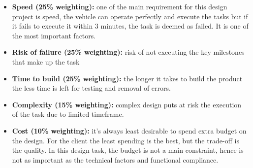 \documentclass[a4paper]{article}
\begin{document}
\begin{itemize}
\item \textbf{Speed (25\% weighting):} one of the main requirement for this design project is speed, the vehicle can operate perfectly and execute the tasks but if it fails to execute it within 3 minutes, the task is deemed as failed. It is one of the most important factors.
\item \textbf{Risk of failure (25\% weighting):} risk of not executing the key milestones that make up the task 
\item \textbf{Time to build (25\% weighting):} the longer it takes to build the product the less time is left for testing and removal of errors.
\item \textbf{Complexity (15\% weighting):} complex design puts at risk the execution of the task due to limited timeframe.
\item \textbf{Cost (10\% weighting):} it’s always least desirable to spend extra budget on the design. For the client the least spending is the best, but the trade-off is the quality. In this design task, the budget is not a main constraint, hence is not as important as the technical factors and functional compliance.
\end{itemize}
\end{document}
